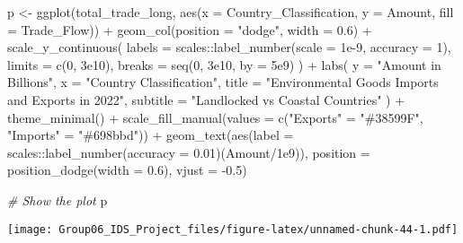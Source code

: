 \documentclass[
]{article}
\newenvironment{Shaded}{\begin{snugshade}}{\end{snugshade}}
\newcommand{\AttributeTok}[1]{\textcolor[rgb]{0.77,0.63,0.00}{#1}}
\newcommand{\CommentTok}[1]{\textcolor[rgb]{0.56,0.35,0.01}{\textit{#1}}}
\newcommand{\DecValTok}[1]{\textcolor[rgb]{0.00,0.00,0.81}{#1}}
\newcommand{\FloatTok}[1]{\textcolor[rgb]{0.00,0.00,0.81}{#1}}
\newcommand{\FunctionTok}[1]{\textcolor[rgb]{0.00,0.00,0.00}{#1}}
\newcommand{\NormalTok}[1]{#1}
\newcommand{\OtherTok}[1]{\textcolor[rgb]{0.56,0.35,0.01}{#1}}
\newcommand{\SpecialCharTok}[1]{\textcolor[rgb]{0.00,0.00,0.00}{#1}}
\newcommand{\StringTok}[1]{\textcolor[rgb]{0.31,0.60,0.02}{#1}}
\begin{document}
\begin{Shaded}
\begin{Highlighting}[]
\NormalTok{p }\OtherTok{\textless{}{-}} \FunctionTok{ggplot}\NormalTok{(total\_trade\_long, }\FunctionTok{aes}\NormalTok{(}\AttributeTok{x =}\NormalTok{ Country\_Classification, }\AttributeTok{y =}\NormalTok{ Amount, }\AttributeTok{fill =}\NormalTok{ Trade\_Flow)) }\SpecialCharTok{+}
  \FunctionTok{geom\_col}\NormalTok{(}\AttributeTok{position =} \StringTok{"dodge"}\NormalTok{, }\AttributeTok{width =} \FloatTok{0.6}\NormalTok{) }\SpecialCharTok{+}
  \FunctionTok{scale\_y\_continuous}\NormalTok{(}
    \AttributeTok{labels =}\NormalTok{ scales}\SpecialCharTok{::}\FunctionTok{label\_number}\NormalTok{(}\AttributeTok{scale =} \FloatTok{1e{-}9}\NormalTok{, }\AttributeTok{accuracy =} \DecValTok{1}\NormalTok{),}
    \AttributeTok{limits =} \FunctionTok{c}\NormalTok{(}\DecValTok{0}\NormalTok{, }\FloatTok{3e10}\NormalTok{),}
    \AttributeTok{breaks =} \FunctionTok{seq}\NormalTok{(}\DecValTok{0}\NormalTok{, }\FloatTok{3e10}\NormalTok{, }\AttributeTok{by =} \FloatTok{5e9}\NormalTok{)}
\NormalTok{  ) }\SpecialCharTok{+}
  \FunctionTok{labs}\NormalTok{(}
    \AttributeTok{y =} \StringTok{"Amount in Billions"}\NormalTok{,}
    \AttributeTok{x =} \StringTok{"Country Classification"}\NormalTok{,}
    \AttributeTok{title =} \StringTok{"Environmental Goods Imports and Exports in 2022"}\NormalTok{,}
    \AttributeTok{subtitle =} \StringTok{"Landlocked vs Coastal Countries"}
\NormalTok{  ) }\SpecialCharTok{+}
  \FunctionTok{theme\_minimal}\NormalTok{() }\SpecialCharTok{+}
  \FunctionTok{scale\_fill\_manual}\NormalTok{(}\AttributeTok{values =} \FunctionTok{c}\NormalTok{(}\StringTok{"Exports"} \OtherTok{=} \StringTok{"\#38599F"}\NormalTok{, }\StringTok{"Imports"} \OtherTok{=} \StringTok{"\#698bbd"}\NormalTok{)) }\SpecialCharTok{+}
  \FunctionTok{geom\_text}\NormalTok{(}\FunctionTok{aes}\NormalTok{(}\AttributeTok{label =}\NormalTok{ scales}\SpecialCharTok{::}\FunctionTok{label\_number}\NormalTok{(}\AttributeTok{accuracy =} \FloatTok{0.01}\NormalTok{)(Amount}\SpecialCharTok{/}\FloatTok{1e9}\NormalTok{)),}
            \AttributeTok{position =} \FunctionTok{position\_dodge}\NormalTok{(}\AttributeTok{width =} \FloatTok{0.6}\NormalTok{), }\AttributeTok{vjust =} \SpecialCharTok{{-}}\FloatTok{0.5}\NormalTok{)}

\CommentTok{\# Show the plot}
\NormalTok{p}
\end{Highlighting}
\end{Shaded}

\texttt{[image: Group06\_IDS\_Project\_files/figure-latex/unnamed-chunk-44-1.pdf]}
\end{document}
